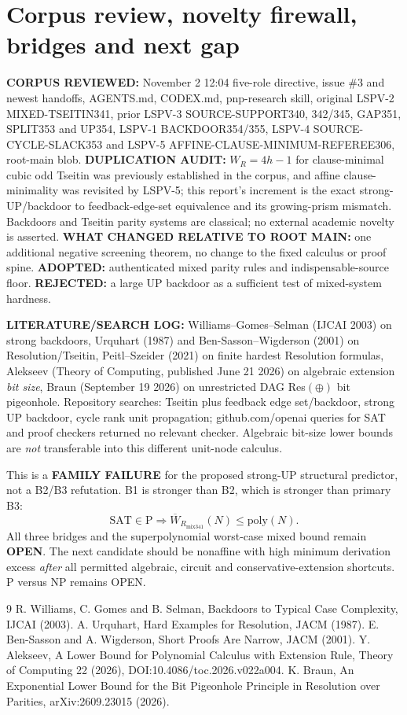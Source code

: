 \documentclass[11pt]{article}
\begin{document}
\section*{Corpus review, novelty firewall, bridges and next gap}
\textbf{CORPUS REVIEWED:} November 2 12:04 five-role directive, issue \#3 and newest handoffs, AGENTS.md, CODEX.md, pnp-research skill, original LSPV-2 MIXED-TSEITIN341, prior LSPV-3 SOURCE-SUPPORT340, 342/345, GAP351, SPLIT353 and UP354, LSPV-1 BACKDOOR354/355, LSPV-4 SOURCE-CYCLE-SLACK353 and LSPV-5 AFFINE-CLAUSE-MINIMUM-REFEREE306, root-main blob. \textbf{DUPLICATION AUDIT:} $W_R=4h-1$ for clause-minimal cubic odd Tseitin was previously established in the corpus, and affine clause-minimality was revisited by LSPV-5; this report's increment is the exact strong-UP/backdoor to feedback-edge-set equivalence and its growing-prism mismatch. Backdoors and Tseitin parity systems are classical; no external academic novelty is asserted. \textbf{WHAT CHANGED RELATIVE TO ROOT MAIN:} one additional negative screening theorem, no change to the fixed calculus or proof spine. \textbf{ADOPTED:} authenticated mixed parity rules and indispensable-source floor. \textbf{REJECTED:} a large UP backdoor as a sufficient test of mixed-system hardness.

\textbf{LITERATURE/SEARCH LOG:} Williams--Gomes--Selman (IJCAI 2003) on strong backdoors, Urquhart (1987) and Ben-Sasson--Wigderson (2001) on Resolution/Tseitin, Peitl--Szeider (2021) on finite hardest Resolution formulas, Alekseev (Theory of Computing, published June 21 2026) on algebraic extension \emph{bit size}, Braun (September 19 2026) on unrestricted DAG Res$(\oplus)$ bit pigeonhole. Repository searches: Tseitin plus feedback edge set/backdoor, strong UP backdoor, cycle rank unit propagation; github.com/openai queries for SAT and proof checkers returned no relevant checker. Algebraic bit-size lower bounds are \emph{not} transferable into this different unit-node calculus.

This is a \textbf{FAMILY FAILURE} for the proposed strong-UP structural predictor, not a B2/B3 refutation. B1 is stronger than B2, which is stronger than primary B3:
\[
\mathrm{SAT}\in\mathrm P\Longrightarrow
\overline W_{R_{\mathrm{mix341}}}(N)\le\mathrm{poly}(N).
\]
All three bridges and the superpolynomial worst-case mixed bound remain \textbf{OPEN}. The next candidate should be nonaffine with high minimum derivation excess \emph{after} all permitted algebraic, circuit and conservative-extension shortcuts. P versus NP remains OPEN.

\begin{thebibliography}{9}
 R. Williams, C. Gomes and B. Selman, Backdoors to Typical Case Complexity, IJCAI (2003).
 A. Urquhart, Hard Examples for Resolution, JACM (1987).
 E. Ben-Sasson and A. Wigderson, Short Proofs Are Narrow, JACM (2001).
 Y. Alekseev, A Lower Bound for Polynomial Calculus with Extension Rule, Theory of Computing 22 (2026), DOI:10.4086/toc.2026.v022a004.
 K. Braun, An Exponential Lower Bound for the Bit Pigeonhole Principle in Resolution over Parities, arXiv:2609.23015 (2026).
\end{thebibliography}
\end{document}

